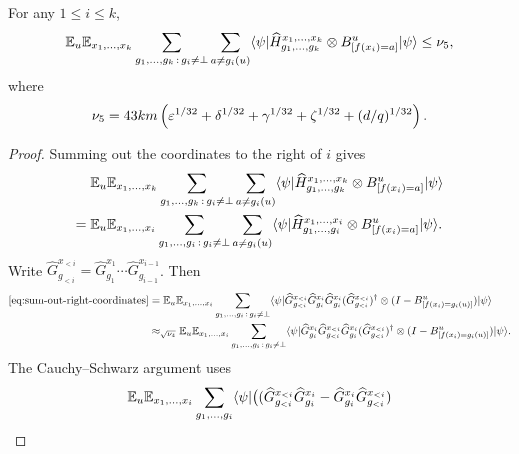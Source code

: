 \begin{lemma}\label{lem:ld-sandwich-line-one-point}
	\leanok
	For any $1 \le i \le k$,
	\[
		\mathbb{E}_u \mathbb{E}_{x_1,\dots,x_k} \sum_{g_1,\dots,g_k\,:\,g_i\ne\bot} \sum_{a\ne g_i(u)}
		\langle \psi \rvert \widehat H_{g_1,\dots,g_k}^{x_1,\dots,x_k} \otimes B_{[f(x_i)=a]}^u \lvert \psi \rangle
		\le \nu_5,
	\]
	where
	\[
		\nu_5 = 43km\left(\varepsilon^{1/32}+\delta^{1/32}+\gamma^{1/32}+\zeta^{1/32}+(d/q)^{1/32}\right).
	\]
\end{lemma}
\begin{proof}
	\leanok
	Summing out the coordinates to the right of $i$ gives
	\begin{equation}\label{eq:sum-out-right-coordinates}
		\begin{aligned}
			    & \mathbb{E}_u \mathbb{E}_{x_1,\dots,x_k} \sum_{g_1,\dots,g_k\,:\,g_i\ne\bot} \sum_{a\ne g_i(u)}
			\langle \psi \rvert \widehat H_{g_1,\dots,g_k}^{x_1,\dots,x_k} \otimes B_{[f(x_i)=a]}^u \lvert \psi \rangle \\
			={} &
			\mathbb{E}_u \mathbb{E}_{x_1,\dots,x_i} \sum_{g_1,\dots,g_i\,:\,g_i\ne\bot} \sum_{a\ne g_i(u)}
			\langle \psi \rvert \widehat H_{g_1,\dots,g_i}^{x_1,\dots,x_i} \otimes B_{[f(x_i)=a]}^u \lvert \psi \rangle.
		\end{aligned}
	\end{equation}
	Write $\widehat G_{g_{<i}}^{x_{<i}} = \widehat G_{g_1}^{x_1}\cdots \widehat G_{g_{i-1}}^{x_{i-1}}$. Then
	\begin{align}
		\eqref{eq:sum-out-right-coordinates}
		 & =
		\mathbb{E}_u \mathbb{E}_{x_1,\dots,x_i} \sum_{g_1,\dots,g_i\,:\,g_i\ne\bot}
		\langle \psi \rvert
		\widehat G_{g_{<i}}^{x_{<i}} \widehat G_{g_i}^{x_i}\widehat G_{g_i}^{x_i} (\widehat G_{g_{<i}}^{x_{<i}})^\dagger
		\otimes (I-B_{[f(x_i)=g_i(u)]}^u)\lvert \psi \rangle\nonumber \\
		 & \approx_{\sqrt{\nu_4}}
		\mathbb{E}_u \mathbb{E}_{x_1,\dots,x_i} \sum_{g_1,\dots,g_i\,:\,g_i\ne\bot}
		\langle \psi \rvert
		\widehat G_{g_i}^{x_i}\widehat G_{g_{<i}}^{x_{<i}}\widehat G_{g_i}^{x_i}(\widehat G_{g_{<i}}^{x_{<i}})^\dagger
		\otimes (I-B_{[f(x_i)=g_i(u)]}^u)\lvert \psi \rangle.
		\label{eq:half-sandwich-first-commutation}
	\end{align}
	The Cauchy--Schwarz argument uses
	\begin{equation}\label{eq:completed-outcome-commutator}
		\E_u \E_{x_1,\dots,x_i} \sum_{g_1,\dots,g_i}
		\bra{\psi}
		\bigl((\widehat G_{g_{<i}}^{x_{<i}}\widehat G_{g_i}^{x_i} - \widehat G_{g_i}^{x_i}\widehat G_{g_{<i}}^{x_{<i}})

\end{equation}
\end{proof}
